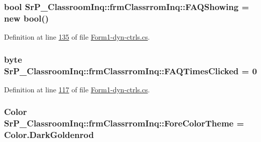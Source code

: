 \hypertarget{class_sr_p___classroom_inq_1_1frm_classrrom_inq_a37a892198dda5bfa752c66df2debb199}{
\subsubsection[{\-F\-A\-Q\-Showing}]{\setlength{\rightskip}{0pt plus 5cm}bool {\bf \-Sr\-P\-\_\-\-Classroom\-Inq\-::frm\-Classrrom\-Inq\-::\-F\-A\-Q\-Showing} = new bool()}}
\label{class_sr_p___classroom_inq_1_1frm_classrrom_inq_a37a892198dda5bfa752c66df2debb199}


\-Definition at line \hyperlink{_form1-dyn-ctrls_8cs_source_l00135}{135} of file \hyperlink{_form1-dyn-ctrls_8cs_source}{\-Form1-\/dyn-\/ctrls.\-cs}.

\hypertarget{class_sr_p___classroom_inq_1_1frm_classrrom_inq_a81d1b27ebc720a6da339e1816eab4dfa}{
\subsubsection[{\-F\-A\-Q\-Times\-Clicked}]{\setlength{\rightskip}{0pt plus 5cm}byte {\bf \-Sr\-P\-\_\-\-Classroom\-Inq\-::frm\-Classrrom\-Inq\-::\-F\-A\-Q\-Times\-Clicked} = 0}}
\label{class_sr_p___classroom_inq_1_1frm_classrrom_inq_a81d1b27ebc720a6da339e1816eab4dfa}


\-Definition at line \hyperlink{_form1-dyn-ctrls_8cs_source_l00117}{117} of file \hyperlink{_form1-dyn-ctrls_8cs_source}{\-Form1-\/dyn-\/ctrls.\-cs}.

\hypertarget{class_sr_p___classroom_inq_1_1frm_classrrom_inq_ac239384db4489bc4b8b2a4cee9280849}{
\subsubsection[{\-Fore\-Color\-Theme}]{\setlength{\rightskip}{0pt plus 5cm}\-Color {\bf \-Sr\-P\-\_\-\-Classroom\-Inq\-::frm\-Classrrom\-Inq\-::\-Fore\-Color\-Theme} = \-Color.\-Dark\-Goldenrod}}
\label{class_sr_p___classroom_inq_1_1frm_classrrom_inq_ac239384db4489bc4b8b2a4cee9280849}


